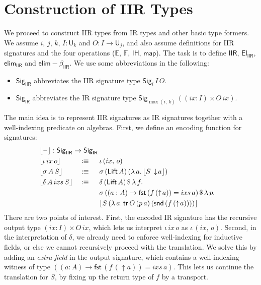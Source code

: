 \documentclass[acmsmall,screen,review]{acmart}
\newcommand{\msf}[1]{{\mathsf{#1}}}
\newcommand{\mbb}[1]{\mathbb{#1}}
\newcommand{\U}{\msf{U}}
\newcommand{\El}{\msf{El}}
\newcommand{\Lift}{\msf{Lift}}
\newcommand{\lup}{\uparrow}
\newcommand{\ldown}{\downarrow}
\newcommand{\Sig}{\msf{Sig}}
\newcommand{\blank}{{\mathord{\hspace{1pt}\text{--}\hspace{1pt}}}}
\newcommand{\ix}{{ix}}
\newcommand{\ixs}{{ixs}}
\newcommand{\IR}{\msf{IR}}
\newcommand{\IH}{\msf{IH}}
\newcommand{\map}{\msf{map}}
\newcommand{\elim}{\msf{elim}}
\newcommand{\tr}{\msf{tr}}
\newcommand{\fst}{\msf{fst}}
\newcommand{\snd}{\msf{snd}}
\newcommand{\IIR}{\msf{IIR}}
\newcommand{\Sigr}[1]{\lfloor #1 \rfloor}
\newcommand{\E}{\mbb{E}}
\newcommand{\F}{\mbb{F}}
\begin{document}
\section{Construction of IIR Types}\label{sec:iir-construction}

We proceed to construct IIR types from IR types and other basic type formers. We assume $i$, $j$,
$k$, $I : \U_k$ and $O : I \to \U_j$, and also assume definitions for IIR signatures and the four
operations ($\E$, $\F$, $\IH$, $\map$). The task is to define $\IIR$,
$\El_{\IIR}$, $\elim_{\IIR}$ and $\elim\!-\!\!\beta_{\IIR}$. We use some abbreviations in the following:
\begin{itemize}
\item $\Sig_\IIR$ abbreviates the IIR signature type $\Sig_i\,I\,O$.
\item $\Sig_\IR$ abbreviates the IR signature type $\Sig_{\max(i,\,k)}\,((\ix : I) \times O\,\ix)$.
\end{itemize}
The main idea is to represent IIR signatures as IR signatures together with a
well-indexing predicate on algebras. First, we define an encoding function for signatures:
\begin{alignat*}{4}
  & \rlap{$\Sigr{\blank} : \Sig_\IIR \to \Sig_\IR$}\\
  & \Sigr{\iota\,\ix\,o}      &&:\equiv \hspace{0.5em} &&\iota\,(\ix,\,o)\\
  & \Sigr{\sigma\,A\,S}       &&:\equiv \hspace{0.5em} &&\sigma\,(\Lift\,A)\,(\lambda\,a.\,\Sigr{S\,\ldown\!a})\\
  & \Sigr{\delta\,A\,\ixs\,S} &&:\equiv \hspace{0.5em} &&\delta\,(\Lift\,A)\,\$\,\lambda\,f.\\
  &  &&                                &&\sigma\,((a : A) \to \fst\,(f\,(\lup\!a)) = \ixs\,a)\,\$\,\lambda\,p.\\
  &  &&                                &&\Sigr{S\,(\lambda\,a.\,\tr\,O\,(p\,a)\,(\snd\,(f\,(\lup\! a))))}
\end{alignat*}
There are two points of interest. First, the encoded IR signature has the recursive output type $(\ix
: I) \times O\,\ix$, which lets us interpret $\iota\,\ix\,o$ as $\iota\,(\ix,\,o)$. Second, in the
interpretation of $\delta$, we already need to enforce well-indexing for inductive fields, or else
we cannot recursively proceed with the translation. We solve this by adding an \emph{extra field} in
the output signature, which contains a well-indexing witness of type $((a : A) \to \fst\,(f\,(\lup\!a)) = \ixs\,a)$.
This lets us continue the translation for $S$, by fixing up the return type of $f$ by a transport.
\end{document}
